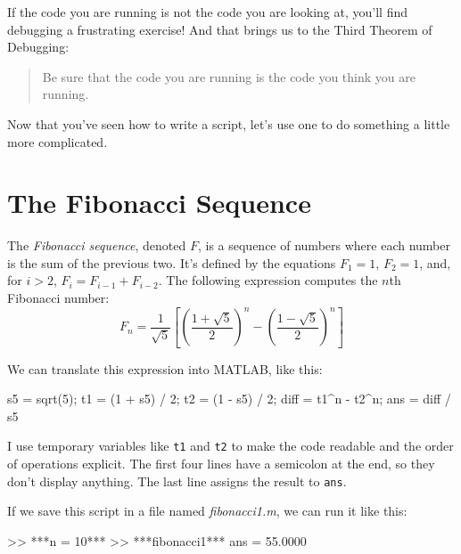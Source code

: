 

If the code you are running is not the code you are looking
at, you'll find debugging a frustrating exercise!  And that brings
us to the Third Theorem of Debugging:

\begin{quote}
Be sure that the code you are running
is the code you think you are running.
\end{quote}

Now that you've seen how to write a script, let's use one to do something a little more complicated. 

\section{The Fibonacci Sequence}


The \emph{Fibonacci sequence}, denoted $F$, is a sequence of numbers where each number is the sum of the previous two. 
It's defined by the equations $F_1 = 1$, $F_2 = 1$, and, for $i > 2$, $F_{i} = F_{i-1} + F_{i-2}$.
The following expression computes the $n$th Fibonacci number:
%
\begin{equation*}
F_n = \frac{1}{\sqrt{5}}
\left[
\left( \frac{1 + \sqrt{5}}{2} \right)^{n} -
\left( \frac{1 - \sqrt{5}}{2} \right)^{n}
\right]
\end{equation*}
%

We can translate this expression into MATLAB, like this:

\begin{code}
s5 = sqrt(5);
t1 = (1 + s5) / 2;
t2 = (1 - s5) / 2;
diff = t1^n - t2^n;
ans = diff / s5
\end{code}

I use temporary variables like \lstinline{t1} and \lstinline{t2} to make the code readable and the order of operations explicit.  The first four lines have a semicolon at the end, so they don't display anything.  The last line assigns the result to \lstinline{ans}.


If we save this script in a file named {\em fibonacci1.m}, we can run it like this:

\begin{code}
>> ***n = 10***
>> ***fibonacci1***
ans = 55.0000
\end{code}

